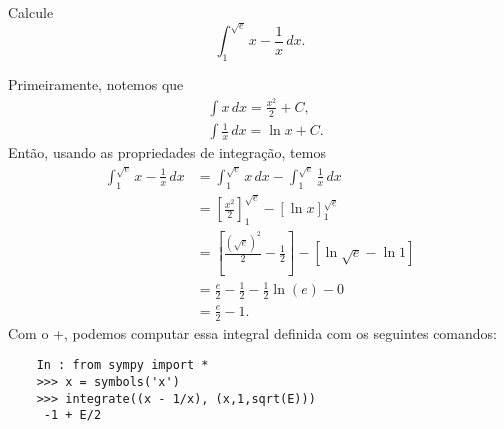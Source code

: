 \begin{exeresol}
  Calcule
  \begin{equation}
    \int_1^{\sqrt{e}} x - \frac{1}{x}\,dx.
  \end{equation}
\end{exeresol}
\begin{resol}
  Primeiramente, notemos que
  \begin{align}
    & \int x\,dx = \frac{x^2}{2} + C,\\
    & \int \frac{1}{x}\,dx = \ln x + C.
  \end{align}
  Então, usando as propriedades de integração, temos
  \begin{align}
    \int_1^{\sqrt{e}} x - \frac{1}{x}\,dx &= \int_1^{\sqrt{e}} x\,dx - \int_1^{\sqrt{e}} \frac{1}{x}\,dx \\
                                 &= \left[\frac{x^2}{2}\right]_1^{\sqrt{e}} - \left[\ln x\right]_1^{\sqrt{e}} \\
                                          &= \left[\frac{(\sqrt{e})^2}{2} - \frac{1}{2}\right] - \left[\ln\sqrt{e} - \ln 1\right]\\
                                          &= \frac{e}{2} - \frac{1}{2} - \frac{1}{2}\ln(e) - 0 \\
                                          &= \frac{e}{2} - 1.
  \end{align}
  \ifispython
  Com o {\python}+{\sympy}, podemos computar essa integral definida com os seguintes comandos:
  \begin{lstlisting}
    In : from sympy import *
    >>> x = symbols('x')
    >>> integrate((x - 1/x), (x,1,sqrt(E)))
     -1 + E/2
  \end{lstlisting}
  \fi  
\end{resol}

